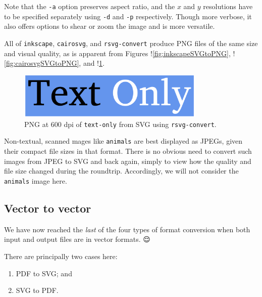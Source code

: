 \documentclass[
  a4paper,
]{article}
\providecommand{\tightlist}{%
  \setlength{\itemsep}{0pt}\setlength{\parskip}{0pt}}
\begin{document}
Note that the \texttt{-a} option preserves aspect ratio, and the \(x\)
and \(y\) resolutions have to be specified separately using \texttt{-d}
and \texttt{-p} respectively. Though more verbose, it also offers
options to shear or zoom the image and is more versatile.

All of \texttt{inkscape}, \texttt{cairosvg}, and \texttt{rsvg-convert}
produce PNG files of the same size and visual quality, as is apparent
from Figures !\cref{fig:inkscapeSVGtoPNG}, !\cref{fig:cairosvgSVGtoPNG},
and !\cref{fig:rsvg-convertSVGtoPNG}.

\begin{figure}
\hypertarget{fig:rsvg-convertSVGtoPNG}{%
\centering
\includegraphics[width=0.8\textwidth,height=\textheight]{images/text-only-600-dpi-rsvg-convert.png}
\caption{PNG at 600 dpi of \texttt{text-only} from SVG using
\texttt{rsvg-convert}.}\label{fig:rsvg-convertSVGtoPNG}
}
\end{figure}

Non-textual, scanned mages like \texttt{animals} are best displayed as
JPEGs, given their compact file sizes in that format. There is no
obvious need to convert such images from JPEG to SVG and back again,
simply to view how the quality and file size changed during the
roundtrip. Accordingly, we will not consider the \texttt{animals} image
here.

\hypertarget{vector-to-vector}{%
\subsection{Vector to vector}\label{vector-to-vector}}

We have now reached the \emph{last} of the four types of format
conversion when both input and output files are in vector formats.
 {😌} \normalfont

There are principally two cases here:

\begin{enumerate}
\def\labelenumi{\alph{enumi}.}
\tightlist
\item
  PDF to SVG; and
\item
  SVG to PDF.
\end{enumerate}
\end{document}

